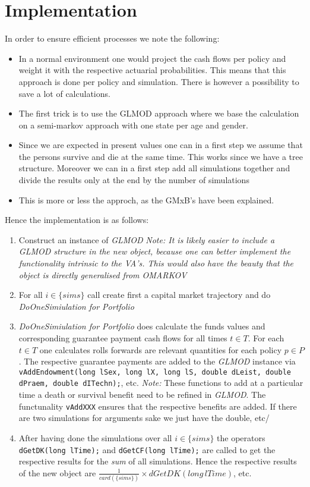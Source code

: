 \documentclass[10pt, a4paper,landscape]{article}
\begin{document}
\section{Implementation}
In order to ensure efficient processes we note the following:
\begin{itemize}
\item In a normal environment one would project the cash flows per policy and weight it with the respective actuarial
  probabilities. This means that this approach is done per policy and simulation. There is however a possibility to save a lot of
  calculations.
\item The first trick is to use the GLMOD approach where we base the  calculation on a semi-markov approach with one state per age and gender.
\item Since we are expected in present values one can in a first step
  we assume that the persons survive and die at the same time. This
  works since we have a tree structure. Moreover we can in a first step add all simulations together and divide the results only at the end by the number of simulations
\item This is more or less the approch, as the GMxB's have been explained.
\end{itemize}

Hence the implementation is as follows:

\begin{enumerate}
\item Construct an instance of {\em GLMOD} {\em Note: It is likely easier to include a GLMOD structure in the new object, because one can better implement the functionality intrinsic to the VA's. This would also have the beauty that the object is directly generalised from OMARKOV}
\item For all $i \in \{sims\}$ call  create first a capital market trajectory and do {\em DoOneSimiulation for Portfolio}
\item {\em DoOneSimiulation for Portfolio} does calculate the funds values and corresponding guarantee payment cash flows for all times $t \in T$. For each $t \in T$ one calculates rolls forwards are relevant quantities for each policy $p \in P$. The respective guarantee payments are added to the {\em GLMOD} instance via {\tt vAddEndowment(long lSex, long lX, long lS, double dLeist, double dPraem, double dITechn);}, etc. {\em Note:} These functions to add at a particular time a death or survival benefit need to be refined in {\em GLMOD}. The functunality {\tt vAddXXX} ensures that the respective benefits are added. If there are two simulations for arguments sake we just have the double, etc/
\item After having done the simulations over all $i \in \{sims\}$ the operators {\tt dGetDK(long lTime);} and {\tt dGetCF(long lTime);} are called to get the respective results for the {\em sum} of all simulations. Hence the respective results of the new object are $\frac{1}{card(\{sims\})} \times dGetDK(long\, lTime)$, etc.
\end{enumerate}
\end{document}
